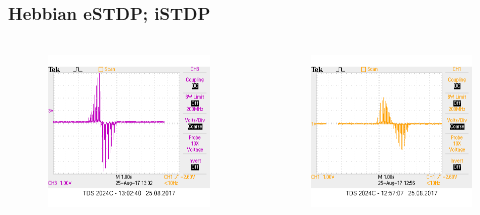 \documentclass[12pt, aspectratio=169]{beamer}
\begin{document}
\begin{frame}
\frametitle{Hebbian eSTDP; iSTDP}
\begin{columns}[c] %
\begin{figure}
\includegraphics[width=1\linewidth]{hebb_output_single}
\end{figure}
\begin{figure}
\includegraphics[width=1\linewidth]{inh_output_single}
\end{figure}
\end{columns}
\end{frame}
\end{document}
